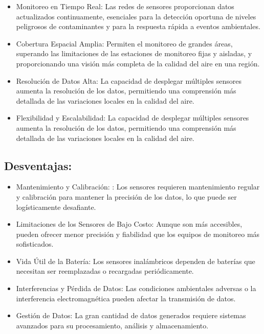 \begin{itemize}
\item Monitoreo en Tiempo Real: Las redes de sensores proporcionan datos actualizados continuamente, esenciales para la detección oportuna de niveles peligrosos de contaminantes y para la respuesta rápida a eventos ambientales.

\item Cobertura Espacial Amplia: Permiten el monitoreo de grandes áreas, superando las limitaciones de las estaciones de monitoreo fijas y aisladas, y proporcionando una visión más completa de la calidad del aire en una región.

\item Resolución de Datos Alta: La capacidad de desplegar múltiples sensores aumenta la resolución de los datos, permitiendo una comprensión más detallada de las variaciones locales en la calidad del aire.

\item Flexibilidad y Escalabilidad: La capacidad de desplegar múltiples sensores aumenta la resolución de los datos, permitiendo una comprensión más detallada de las variaciones locales en la calidad del aire.
\end{itemize}


\subsection{Desventajas:}
\begin{itemize}
\item Mantenimiento y Calibración: : Los sensores requieren mantenimiento regular y calibración para mantener la precisión de los datos, lo que puede ser logísticamente desafiante.

\item Limitaciones de los Sensores de Bajo Costo:  Aunque son más accesibles, pueden ofrecer menor precisión y fiabilidad que los equipos de monitoreo más sofisticados.

\item Vida Útil de la Batería: Los sensores inalámbricos dependen de baterías que necesitan ser reemplazadas o recargadas periódicamente.

\item Interferencias y Pérdida de Datos: Las condiciones ambientales adversas o la interferencia electromagnética pueden afectar la transmisión de datos.

\item Gestión de Datos:  La gran cantidad de datos generados requiere sistemas avanzados para su procesamiento, análisis y almacenamiento.
\end{itemize}

